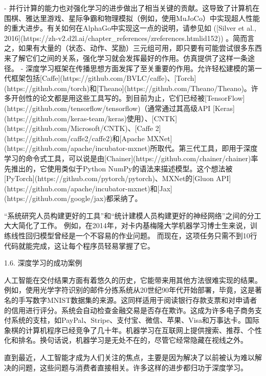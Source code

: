 - 并行计算的能力也对强化学习的进步做出了相当关键的贡献。这导致了计算机在围棋、雅达里游戏、星际争霸和物理模拟（例如，使用MuJoCo）中实现超人性能的重大进步。有关如何在AlphaGo中实现这一点的说明，请参见如 ([Silver et al., 2016](https://zh-v2.d2l.ai/chapter\_references/zreferences.htmlid152)) 。简而言之，如果有大量的（状态、动作、奖励）三元组可用，即只要有可能尝试很多东西来了解它们之间的关系，强化学习就会发挥最好的作用。仿真提供了这样一条途径。
- 深度学习框架在传播思想方面发挥了至关重要的作用。允许轻松建模的第一代框架包括[Caffe](https://github.com/BVLC/caffe)、[Torch](https://github.com/torch)和[Theano](https://github.com/Theano/Theano)。许多开创性的论文都是用这些工具写的。到目前为止，它们已经被[TensorFlow](https://github.com/tensorflow/tensorflow)（通常通过其高级API [Keras](https://github.com/keras-team/keras)使用）、[CNTK](https://github.com/Microsoft/CNTK)、[Caffe 2](https://github.com/caffe2/caffe2)和[Apache MXNet](https://github.com/apache/incubator-mxnet)所取代。第三代工具，即用于深度学习的命令式工具，可以说是由[Chainer](https://github.com/chainer/chainer)率先推出的，它使用类似于Python NumPy的语法来描述模型。这个想法被[PyTorch](https://github.com/pytorch/pytorch)、MXNet的[Gluon API](https://github.com/apache/incubator-mxnet)和[Jax](https://github.com/google/jax)都采纳了。

“系统研究人员构建更好的工具”和“统计建模人员构建更好的神经网络”之间的分工大大简化了工作。 例如，在2014年，对卡内基梅隆大学机器学习博士生来说，训练线性回归模型曾经是一个不容易的作业问题。 而现在，这项任务只需不到10行代码就能完成，这让每个程序员轻易掌握了它。

 1.6. 深度学习的成功案例

人工智能在交付结果方面有着悠久的历史，它能带来用其他方法很难实现的结果。例如，使用光学字符识别的邮件分拣系统从20世纪90年代开始部署，毕竟，这是著名的手写数字MNIST数据集的来源。这同样适用于阅读银行存款支票和对申请者的信用进行评分。系统会自动检查金融交易是否存在欺诈。这成为许多电子商务支付系统的支柱，如PayPal、Stripe、支付宝、微信、苹果、Visa和万事达卡。国际象棋的计算机程序已经竞争了几十年。机器学习在互联网上提供搜索、推荐、个性化和排名。换句话说，机器学习是无处不在的，尽管它经常隐藏在视线之外。

直到最近，人工智能才成为人们关注的焦点，主要是因为解决了以前被认为难以解决的问题，这些问题与消费者直接相关。许多这样的进步都归功于深度学习。

